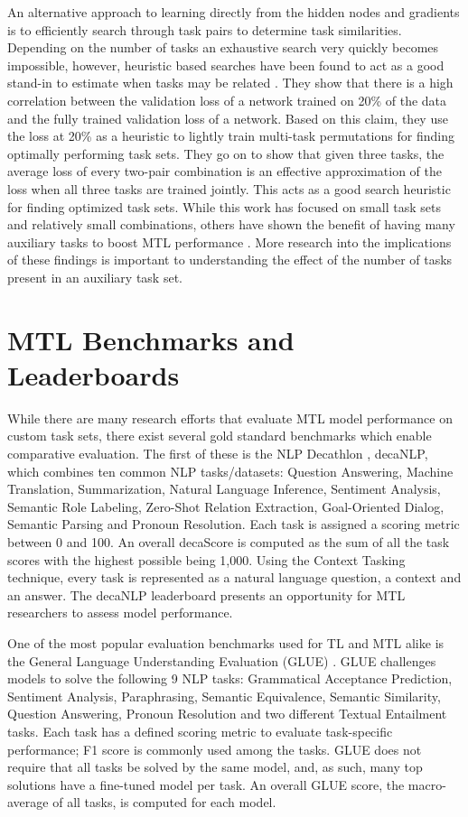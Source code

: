 \documentclass[twocolumn]{article}
\begin{document}
An alternative approach to learning directly from the hidden nodes and gradients is to efficiently search through task pairs to determine task similarities. Depending on the number of tasks an exhaustive search very quickly becomes impossible, however, heuristic based searches have been found to act as a good stand-in to estimate when tasks may be related \citep{whichtask19}. They show that there is a high correlation between the validation loss of a network trained on 20\% of the data and the fully trained validation loss of a network. Based on this claim, they use the loss at 20\% as a heuristic to lightly train multi-task permutations for finding optimally performing task sets. They go on to show that given three tasks, the average loss of every two-pair combination is an effective approximation of the loss when all three tasks are trained jointly. This acts as a good search heuristic for finding optimized task sets. While this work has focused on small task sets and relatively small combinations, others have shown the benefit of having many auxiliary tasks to boost MTL performance \citep{mtloverview17,snorkel18,mtdnn19}. More research into the implications of these findings is important to understanding the effect of the number of tasks present in an auxiliary task set.

\section{MTL Benchmarks and Leaderboards}
While there are many research efforts that evaluate MTL model performance on custom task sets, there exist several gold standard benchmarks which enable comparative evaluation. The first of these is the NLP Decathlon \citep{decanlp18}, decaNLP, which combines ten common NLP tasks/datasets: Question Answering, Machine Translation, Summarization, Natural Language Inference, Sentiment Analysis, Semantic Role Labeling, Zero-Shot Relation Extraction, Goal-Oriented Dialog, Semantic Parsing and Pronoun Resolution. Each task is assigned a scoring metric between 0 and 100. An overall decaScore is computed as the sum of all the task scores with the highest possible being 1,000. Using the Context Tasking technique, every task is represented as a natural language question, a context and an answer. The decaNLP leaderboard presents an opportunity for MTL researchers to assess model performance.

One of the most popular evaluation benchmarks used for TL and MTL alike is the General Language Understanding Evaluation (GLUE) \citep{glue18}. GLUE challenges models to solve the following 9 NLP tasks: Grammatical Acceptance Prediction, Sentiment Analysis, Paraphrasing, Semantic Equivalence, Semantic Similarity, Question Answering, Pronoun Resolution and two different Textual Entailment tasks. Each task has a defined scoring metric to evaluate task-specific performance; F1 score is commonly used among the tasks. GLUE does not require that all tasks be solved by the same model, and, as such, many top solutions have a fine-tuned model per task. An overall GLUE score, the macro-average of all tasks, is computed for each model.
\end{document}
